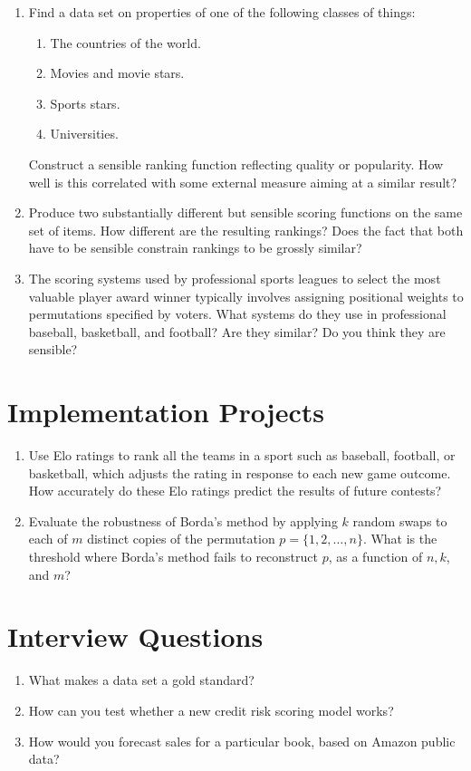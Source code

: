 \documentclass[10pt]{article}
\begin{document}
\begin{enumerate}
    \item Find a data set on properties of one of the following classes of things:
    \begin{enumerate}
        \item The countries of the world.
        \item Movies and movie stars.
        \item Sports stars.
        \item Universities.
    \end{enumerate}
    Construct a sensible ranking function reflecting quality or popularity. How well is this correlated with some external measure aiming at a similar result?
    
    \item Produce two substantially different but sensible scoring functions on the same set of items. How different are the resulting rankings? Does the fact that both have to be sensible constrain rankings to be grossly similar?
    
    \item The scoring systems used by professional sports leagues to select the most valuable player award winner typically involves assigning positional weights to permutations specified by voters. What systems do they use in professional baseball, basketball, and football? Are they similar? Do you think they are sensible?
\end{enumerate}

\section*{Implementation Projects}
\begin{enumerate}
    \item Use Elo ratings to rank all the teams in a sport such as baseball, football, or basketball, which adjusts the rating in response to each new game outcome. How accurately do these Elo ratings predict the results of future contests?
    
    \item Evaluate the robustness of Borda's method by applying $k$ random swaps to each of $m$ distinct copies of the permutation $p=\{1,2, \ldots, n\}$. What is the threshold where Borda's method fails to reconstruct $p$, as a function of $n, k$, and $m$?
\end{enumerate}

\section*{Interview Questions}
\begin{enumerate}
    \item What makes a data set a gold standard?
    \item How can you test whether a new credit risk scoring model works?
    \item How would you forecast sales for a particular book, based on Amazon public data?
\end{enumerate}
\end{document}
